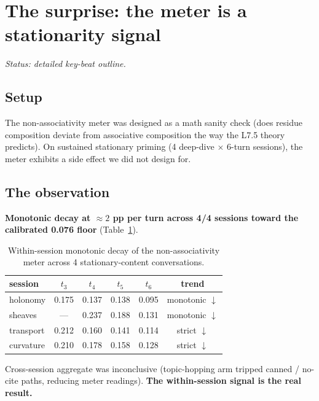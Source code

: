 \documentclass[11pt,letterpaper]{article}
\begin{document}
\section{The surprise: the meter is a stationarity signal}
\label{sec:surprise}

\noindent\emph{Status: detailed key-beat outline.}

\subsection{Setup}

The non-associativity meter was designed as a math sanity check (does
residue composition deviate from associative composition the way the
L7.5 theory predicts). On sustained stationary priming (4 deep-dive
$\times$ 6-turn sessions), the meter exhibits a side effect we did
not design for.

\subsection{The observation}

\textbf{Monotonic decay at $\approx 2$ pp per turn across 4/4
sessions toward the calibrated 0.076 floor}
(Table~\ref{tab:stationarity}).

\begin{table}[h]
\centering
\begin{tabular}{lccccc}
\toprule
session    & $t_3$ & $t_4$ & $t_5$ & $t_6$ & trend \\
\midrule
holonomy   & 0.175 & 0.137 & 0.138 & 0.095 & monotonic $\downarrow$ \\
sheaves    & ---   & 0.237 & 0.188 & 0.131 & monotonic $\downarrow$ \\
transport  & 0.212 & 0.160 & 0.141 & 0.114 & strict $\downarrow$ \\
curvature  & 0.210 & 0.178 & 0.158 & 0.128 & strict $\downarrow$ \\
\bottomrule
\end{tabular}
\caption{Within-session monotonic decay of the non-associativity
meter across 4 stationary-content conversations.}
\label{tab:stationarity}
\end{table}

Cross-session aggregate was inconclusive (topic-hopping arm tripped
canned / no-cite paths, reducing meter readings). \textbf{The
within-session signal is the real result.}
\end{document}
